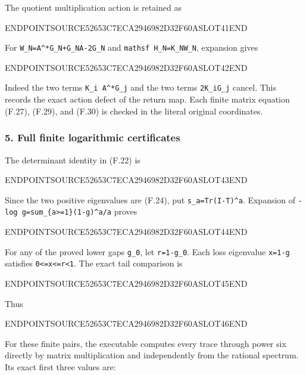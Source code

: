 The quotient multiplication action is retained as

ENDPOINTSOURCE52653C7ECA2946982D32F60ASLOT41END

For \texttt{W\_N=A\^{}*G\_N+G\_NA-2G\_N} and \texttt{mathsf\ H\_N=K\_NW\_N}, expansion gives

ENDPOINTSOURCE52653C7ECA2946982D32F60ASLOT42END

Indeed the two terms \texttt{K\_i\ A\^{}*G\_j} and the two terms \texttt{2K\_iG\_j} cancel. This records the exact action defect of the return map. Each finite matrix equation (F.27), (F.29), and (F.30) is checked in the literal original coordinates.

\subsubsection{5. Full finite logarithmic certificates}\label{endpoint-restriction_fixture--full-finite-logarithmic-certificates}

The determinant identity in (F.22) is

ENDPOINTSOURCE52653C7ECA2946982D32F60ASLOT43END

Since the two positive eigenvalues are (F.24), put \texttt{s\_a=Tr(I-T)\^{}a}. Expansion of \texttt{-log\ g=sum\_\{a\textgreater{}=1\}(1-g)\^{}a/a} proves

ENDPOINTSOURCE52653C7ECA2946982D32F60ASLOT44END

For any of the proved lower gaps \texttt{g\_0}, let \texttt{r=1-g\_0}. Each loss eigenvalue \texttt{x=1-g} satisfies \texttt{0\textless{}=x\textless{}=r\textless{}1}. The exact tail comparison is

ENDPOINTSOURCE52653C7ECA2946982D32F60ASLOT45END

Thus

ENDPOINTSOURCE52653C7ECA2946982D32F60ASLOT46END

For these finite pairs, the executable computes every trace through power six directly by matrix multiplication and independently from the rational spectrum. Its exact first three values are:


